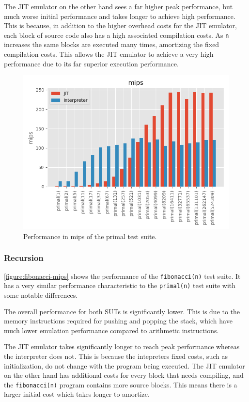 The JIT emulator on the other hand sees a far higher peak performance, but much worse initial performance and takes longer to achieve high performance. This is because, in addition to the higher overhead costs for the JIT emulator, each block of source code also has a high associated compilation costs. As \texttt{n} increases the same blocks are executed many times, amortizing the fixed compilation costs. This allows the JIT emulator to achieve a very high performance due to its far superior execution performance.

\begin{figure}
    \centering
    \includegraphics{output/graphs/tests/primal/mips.png}
    \caption{Performance in mips of the primal test suite.}
    \label{figure:primal-mips}
\end{figure}

\subsubsection{Recursion}

\autoref{figure:fibonacci-mips} shows the performance of the \texttt{fibonacci(n)} test suite. It has a very similar performance characteristic to the \texttt{primal(n)} test suite with some notable differences.

The overall performance for both SUTs is significantly lower. This is due to the memory instructions required for pushing and popping the stack, which have much lower emulation performance compared to arithmetic instructions.

The JIT emulator takes significantly longer to reach peak performance whereas the interpreter does not. This is because the intepreters fixed costs, such as initialization, do not change with the program being executed. The JIT emulator on the other hand has additional costs for every block that needs compiling, and the \texttt{fibonacci(n)} program contains more source blocks. This means there is a larger initial cost which takes longer to amortize.

